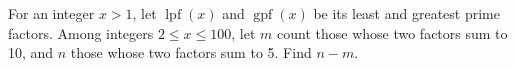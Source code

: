 For an integer $x>1$, let $\operatorname{lpf}(x)$ and $\operatorname{gpf}(x)$ be its least and greatest prime factors. Among integers $2\le x\le100$, let $m$ count those whose two factors sum to 10, and $n$ those whose two factors sum to 5. Find $n-m$.
